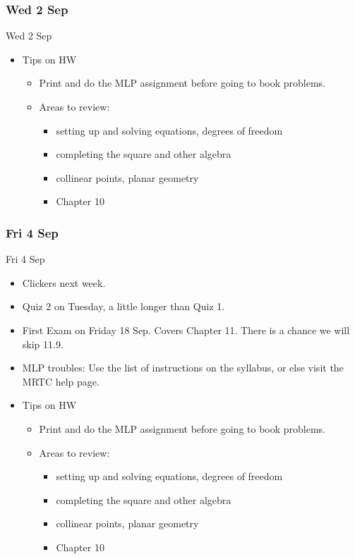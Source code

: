 \documentclass[12pt]{beamer}
\theoremstyle{plain}
\theoremstyle{definition}
\begin{document}
\subsubsection{Wed 2 Sep}
\begin{frame}{Wed 2 Sep}
\begin{itemize}
\item Tips on HW
	\begin{itemize}
	\item Print and do the MLP assignment before going to book problems.
	\item Areas to review:
		\begin{itemize}
		\item setting up and solving equations, degrees of freedom
		\item completing the square and other algebra
		\item collinear points, planar geometry
		\item Chapter 10
		\end{itemize}
	\end{itemize}
\end{itemize}
\end{frame}

\subsubsection{Fri 4 Sep}
\begin{frame}{Fri 4 Sep}
\begin{itemize}
\item Clickers next week.
\item Quiz 2 on Tuesday, a little longer than Quiz 1.
\item First Exam on Friday 18 Sep.  Covers Chapter 11.  There is a chance we will skip 11.9.
\item MLP troubles: Use the list of instructions on the syllabus, or else visit the MRTC help page.
\end{itemize}
\end{frame}

\begin{frame}
\begin{itemize}
\item Tips on HW
	\begin{itemize}
	\item Print and do the MLP assignment before going to book problems.
	\item Areas to review:
		\begin{itemize}
		\item setting up and solving equations, degrees of freedom
		\item completing the square and other algebra
		\item collinear points, planar geometry
		\item Chapter 10
		\end{itemize}
	\end{itemize}
\end{itemize}
\end{frame}
\end{document}
